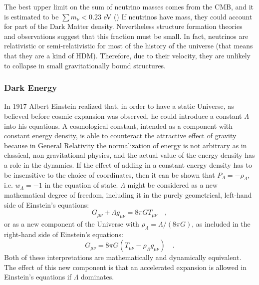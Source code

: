 The best upper limit on the sum of neutrino masses comes from the CMB, and it is estimated to be $\sum m_{\nu} < 0.23$ eV (\citealt{planck16})
If neutrinos have mass, they could account for part of the Dark Matter density. Nevertheless structure formation theories and observations suggest that this fraction must be small. In fact, neutrinos are relativistic or semi-relativistic for most of the history of the universe (that means that they are a kind of HDM). Therefore, due to their velocity, they are unlikely to collapse in small gravitationally bound structures.

\subsubsection{Dark Energy}
In 1917 Albert Einstein realized that, in order to have a static Universe, as believed before cosmic expansion was observed, he could introduce a constant $\Lambda$ into his equations. %
A cosmological constant, intended as a component with constant energy density, is able to counteract the attractive effect of gravity because in General Relativity the normalization of energy is not arbitrary as in classical, non gravitational physics, and the actual value of the energy density has a role in the dynamics. If the effect of adding in a constant energy density has to be insensitive to the choice of coordinates, then it %
can be shown that $P_{\Lambda}=-\rho_{\Lambda}$, i.e. $w_{\Lambda}=-1$ in the equation of state. $\Lambda$ might be considered as a new mathematical degree of freedom, including it in the purely geometrical, left-hand side of Einstein's equations:
\begin{equation}
G_{\mu\nu}+\Lambda g_{\mu\nu}=8\pi G T_{\mu\nu} \quad,
\end{equation}or as a new component of the Universe with $\rho_{\Lambda}=\Lambda/(8 \pi G)$, as included in the right-hand side of Einstein's equations:
\begin{equation}
G_{\mu\nu}=8\pi G(T_{\mu\nu} -\rho_{\Lambda}g_{\mu\nu}) \quad.
\end{equation}
Both of these interpretations are mathematically and dynamically equivalent. The effect of this new component %
is that an accelerated expansion is allowed in Einstein's equations if $\Lambda$ dominates.

